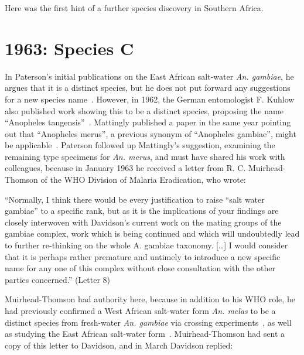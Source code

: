 \documentclass[a4paper,11pt,abstracton,hidelinks]{scrartcl}
\begin{document}
Here was the first hint of a further species discovery in Southern Africa.


\section{1963: Species C}\label{sec:1963}


In Paterson's initial publications on the East African salt-water \textit{An. gambiae}, he argues that it is a distinct species, but he does not put forward any suggestions for a new species name~\parencite{Paterson1962a,Paterson1962b}.
%
However, in 1962, the German entomologist F. Kuhlow also published work showing this to be a distinct species, proposing the name ``Anopheles tangensis''~\parencite{Kuhlow1962}.
%
Mattingly published a paper in the same year pointing out that ``Anopheles merus'', a previous synonym of ``Anopheles gambiae'', might be applicable~\parencite{Mattingly1962}.
%
Paterson followed up Mattingly's suggestion, examining the remaining type specimens for \textit{An. merus}, and must have shared his work with colleagues, because in January 1963 he received a letter from R. C. Muirhead-Thomson of the WHO Division of Malaria Eradication, who wrote:


\begin{displayquote}
``Normally, I think there would be every justification to raise ``salt water gambiae'' to a specific rank, but as it is the implications of your findings are closely interwoven with Davidson's current work on the mating groups of the gambiae complex, work which is being continued and which will undoubtedly lead to further re-thinking on the whole A. gambiae taxonomy. [\ldots] I would consider that it is perhaps rather premature and untimely to introduce a new specific name for any one of this complex without close consultation with the other parties concerned.'' (Letter 8)
\end{displayquote}


Muirhead-Thomson had authority here, because in addition to his WHO role, he had previously confirmed a West African salt-water form \textit{An. melas} to be a distinct species from fresh-water \textit{An. gambiae} via crossing experiments~\parencite{MuirheadThomson1948}, as well as studying the East African salt-water form~\parencite{MuirheadThomson1951}.
%
Muirhead-Thomson had sent a copy of this letter to Davidson, and in March Davidson replied:
\end{document}
